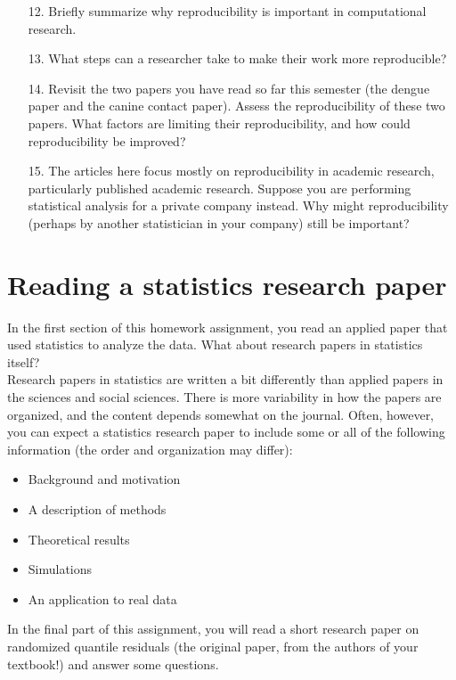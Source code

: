 \documentclass[12pt]{article}
\begin{document}
\begin{enumerate}
\item[12.] Briefly summarize why reproducibility is important in computational research.

\item[13.] What steps can a researcher take to make their work more reproducible?

\item[14.] Revisit the two papers you have read so far this semester (the dengue paper and the canine contact paper). Assess the reproducibility of these two papers. What factors are limiting their reproducibility, and how could reproducibility be improved?

\item[15.] The articles here focus mostly on reproducibility in academic research, particularly published academic research. Suppose you are performing statistical analysis for a private company instead. Why might reproducibility (perhaps by another statistician in your company) still be important?
\end{enumerate}

\section{Reading a statistics research paper}

In the first section of this homework assignment, you read an applied paper that used statistics to analyze the data. What about research papers in statistics itself?\\

\noindent Research papers in statistics are written a bit differently than applied papers in the sciences and social sciences. There is more variability in how the papers are organized, and the content depends somewhat on the journal. Often, however, you can expect a statistics research paper to include some or all of the following information (the order and organization may differ):

\begin{itemize}
\item Background and motivation
\item A description of methods
\item Theoretical results
\item Simulations 
\item An application to real data
\end{itemize}

\noindent In the final part of this assignment, you will read a short research paper on randomized quantile residuals (the original paper, from the authors of your textbook!) and answer some questions.\\
\end{document}
